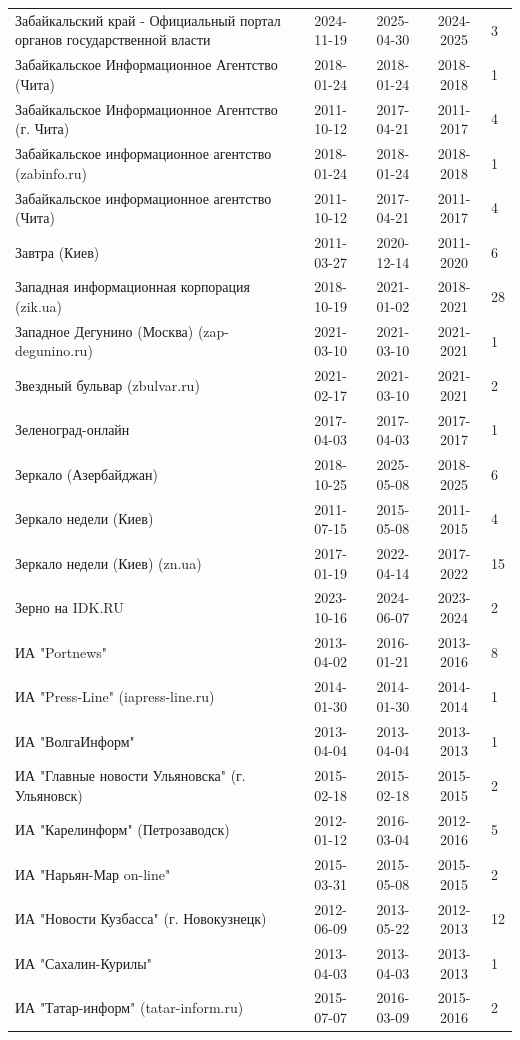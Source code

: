 \begin{longtable}{p{6cm}cccp{2cm}}
Забайкальский край - Официальный портал органов государственной власти & 2024-11-19 & 2025-04-30 & 2024-2025 & 3\\
Забайкальское Информационное Агентство (Чита) & 2018-01-24 & 2018-01-24 & 2018-2018 & 1\\
Забайкальское Информационное Агентство (г. Чита) & 2011-10-12 & 2017-04-21 & 2011-2017 & 4\\
Забайкальское информационное агентство (zabinfo.ru) & 2018-01-24 & 2018-01-24 & 2018-2018 & 1\\
Забайкальское информационное агентство (Чита) & 2011-10-12 & 2017-04-21 & 2011-2017 & 4\\
Завтра (Киев) & 2011-03-27 & 2020-12-14 & 2011-2020 & 6\\
Западная информационная корпорация (zik.ua) & 2018-10-19 & 2021-01-02 & 2018-2021 & 28\\
Западное Дегунино (Москва) (zap-degunino.ru) & 2021-03-10 & 2021-03-10 & 2021-2021 & 1\\
Звездный бульвар (zbulvar.ru) & 2021-02-17 & 2021-03-10 & 2021-2021 & 2\\
Зеленоград-онлайн & 2017-04-03 & 2017-04-03 & 2017-2017 & 1\\
Зеркало (Азербайджан) & 2018-10-25 & 2025-05-08 & 2018-2025 & 6\\
Зеркало недели (Киев) & 2011-07-15 & 2015-05-08 & 2011-2015 & 4\\
Зеркало недели (Киев) (zn.ua) & 2017-01-19 & 2022-04-14 & 2017-2022 & 15\\
Зерно на IDK.RU & 2023-10-16 & 2024-06-07 & 2023-2024 & 2\\
ИА "Portnews" & 2013-04-02 & 2016-01-21 & 2013-2016 & 8\\
ИА "Press-Line" (iapress-line.ru) & 2014-01-30 & 2014-01-30 & 2014-2014 & 1\\
ИА "ВолгаИнформ" & 2013-04-04 & 2013-04-04 & 2013-2013 & 1\\
ИА "Главные новости Ульяновска" (г. Ульяновск) & 2015-02-18 & 2015-02-18 & 2015-2015 & 2\\
ИА "Карелинформ" (Петрозаводск) & 2012-01-12 & 2016-03-04 & 2012-2016 & 5\\
ИА "Нарьян-Мар on-line" & 2015-03-31 & 2015-05-08 & 2015-2015 & 2\\
ИА "Новости Кузбасса" (г. Новокузнецк) & 2012-06-09 & 2013-05-22 & 2012-2013 & 12\\
ИА "Сахалин-Курилы" & 2013-04-03 & 2013-04-03 & 2013-2013 & 1\\
ИА "Татар-информ" (tatar-inform.ru) & 2015-07-07 & 2016-03-09 & 2015-2016 & 2\\

\end{longtable}

